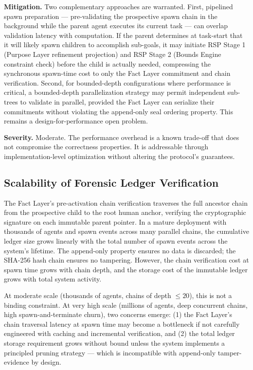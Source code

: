 \textbf{Mitigation.} Two complementary approaches are warranted. First, pipelined spawn preparation — pre-validating the prospective spawn chain in the background while the parent agent executes its current task — can overlap validation latency with computation. If the parent determines at task-start that it will likely spawn children to accomplish sub-goals, it may initiate RSP Stage 1 (Purpose Layer refinement projection) and RSP Stage 2 (Bounds Engine constraint check) before the child is actually needed, compressing the synchronous spawn-time cost to only the Fact Layer commitment and chain verification. Second, for bounded-depth configurations where performance is critical, a bounded-depth parallelization strategy may permit independent sub-trees to validate in parallel, provided the Fact Layer can serialize their commitments without violating the append-only seal ordering property. This remains a design-for-performance open problem.

\textbf{Severity.} Moderate. The performance overhead is a known trade-off that does not compromise the correctness properties. It is addressable through implementation-level optimization without altering the protocol's guarantees.

\subsection{Scalability of Forensic Ledger Verification}

The Fact Layer's pre-activation chain verification traverses the full ancestor chain from the prospective child to the root human anchor, verifying the cryptographic signature on each immutable parent pointer. In a mature deployment with thousands of agents and spawn events across many parallel chains, the cumulative ledger size grows linearly with the total number of spawn events across the system's lifetime. The append-only property ensures no data is discarded; the SHA-256 hash chain ensures no tampering. However, the chain verification cost at spawn time grows with chain depth, and the storage cost of the immutable ledger grows with total system activity.

At moderate scale (thousands of agents, chains of depth $\leq 20$), this is not a binding constraint. At very high scale (millions of agents, deep concurrent chains, high spawn-and-terminate churn), two concerns emerge: (1) the Fact Layer's chain traversal latency at spawn time may become a bottleneck if not carefully engineered with caching and incremental verification, and (2) the total ledger storage requirement grows without bound unless the system implements a principled pruning strategy — which is incompatible with append-only tamper-evidence by design.

